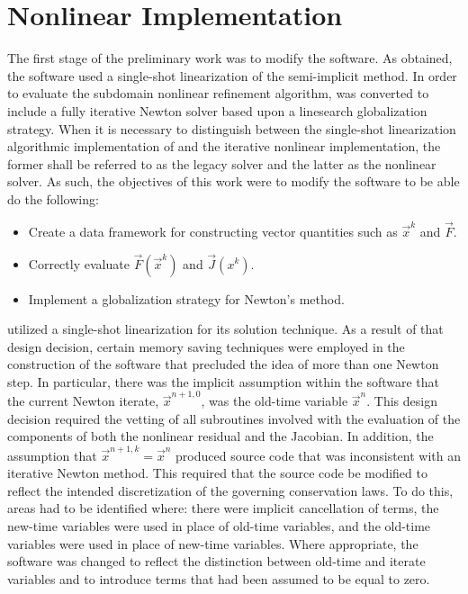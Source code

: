 \section{Nonlinear \cobra{} Implementation}
\label{sect:nl_cobra}
The first stage of the preliminary work was to modify the \cobra{} software.
As obtained, the \cobra{} software used a single-shot linearization  of the semi-implicit method.
In order to evaluate the subdomain nonlinear refinement algorithm, \cobra{} was converted to include a fully iterative Newton solver based upon a linesearch globalization strategy.
When it is necessary to distinguish between the single-shot linearization algorithmic implementation of \cobra{} and the iterative nonlinear \cobra{} implementation, the former shall be referred to as the legacy solver and the latter as the nonlinear solver.
As such, the objectives of this work were to modify the software to be able do the following:

\begin{itemize}
\item{Create a data framework for constructing vector quantities such as $\vec{x}^{k}$ and $\vec{F}$.}
\item{Correctly evaluate $\vec{F}(\vec{x}^{k})$ and $\vec{J}(x^{k})$.}
\item{Implement a globalization strategy for Newton's method.}
\end{itemize}

\cobra{} utilized a single-shot linearization for its solution technique.
As a result of that design decision, certain memory saving techniques were employed in the construction of the software that precluded the idea of more than one Newton step.
In particular, there was the implicit assumption within the software that the current Newton iterate, $\vec{x}^{n+1, 0}$, was the old-time variable $\vec{x}^{n}$.
This design decision required the vetting of all subroutines involved with the evaluation of the components of both the nonlinear residual and the Jacobian.
In addition, the assumption that $\vec{x}^{n+1, k} = \vec{x}^{n}$ produced source code that was inconsistent with an iterative Newton method.
This required that the source code be modified to reflect the intended discretization of the governing conservation laws.
To do this, areas had to be identified where: there were implicit cancellation of terms, the new-time variables were used in place of old-time variables, and the old-time variables were used in place of new-time variables.
Where appropriate, the software was changed to reflect the distinction between old-time and iterate variables and to introduce terms that had been assumed to be equal to zero.

